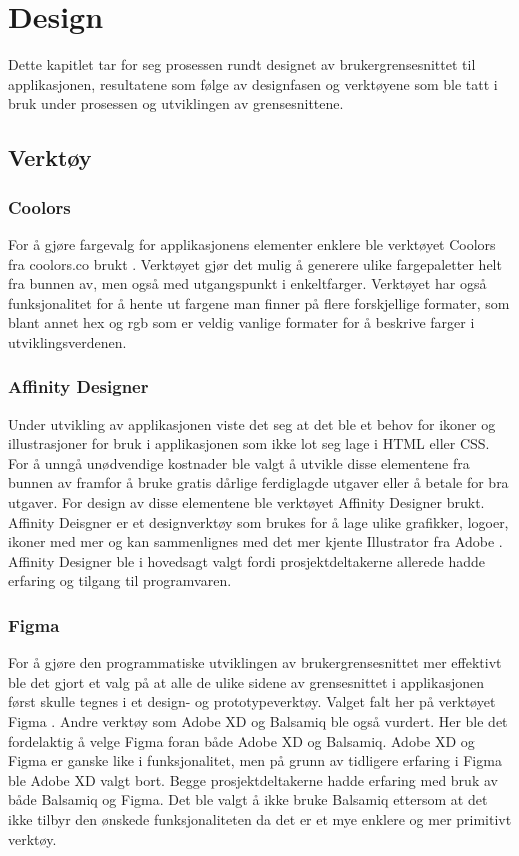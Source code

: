 \chapter{Design} \label{cha:Design}
Dette kapitlet tar for seg prosessen rundt designet av brukergrensesnittet til applikasjonen, resultatene som følge av designfasen og verktøyene som ble tatt i bruk under prosessen og utviklingen av grensesnittene.

\section{Verktøy}
\subsection{Coolors}
For å gjøre fargevalg for applikasjonens elementer enklere ble verktøyet Coolors fra coolors.co brukt \cite{BianchiCoolorsGenerator}. Verktøyet gjør det mulig å generere ulike fargepaletter helt fra bunnen av, men også med utgangspunkt i enkeltfarger. Verktøyet har også funksjonalitet for å hente ut fargene man finner på flere forskjellige formater, som blant annet hex \cite{ColorsHEX} og rgb \cite{ColorsRGB} som er veldig vanlige formater for å beskrive farger i utviklingsverdenen.

\subsection{Affinity Designer}
Under utvikling av applikasjonen viste det seg at det ble et behov for ikoner og illustrasjoner for bruk i applikasjonen som ikke lot seg lage i HTML eller CSS. For å unngå unødvendige kostnader ble valgt å utvikle disse elementene fra bunnen av framfor å bruke gratis dårlige ferdiglagde utgaver eller å betale for bra utgaver. For design av disse elementene ble verktøyet Affinity Designer \cite{AffinitySoftware} brukt. Affinity Deisgner er et designverktøy som brukes for å lage ulike grafikker, logoer, ikoner med mer og kan sammenlignes med det mer kjente Illustrator fra Adobe \cite{BransjeledendeIllustrator}. Affinity Designer ble i hovedsagt valgt fordi prosjektdeltakerne allerede hadde erfaring og tilgang til programvaren.

\subsection{Figma}
For å gjøre den programmatiske utviklingen av brukergrensesnittet mer effektivt ble det gjort et valg på at alle de ulike sidene av grensesnittet i applikasjonen først skulle tegnes i et design- og prototypeverktøy. Valget falt her på verktøyet Figma \cite{Figma:Tool.}. Andre verktøy som Adobe XD \cite{AdobeTool} og Balsamiq \cite{BalsamiqBalsamiq} ble også vurdert. Her ble det fordelaktig å velge Figma foran både Adobe XD og Balsamiq. Adobe XD og Figma er ganske like i funksjonalitet, men på grunn av tidligere erfaring i Figma ble Adobe XD valgt bort. Begge prosjektdeltakerne hadde erfaring med bruk av både Balsamiq og Figma. Det ble valgt å ikke bruke Balsamiq ettersom at det ikke tilbyr den ønskede funksjonaliteten da det er et mye enklere og mer primitivt verktøy.
\newline

